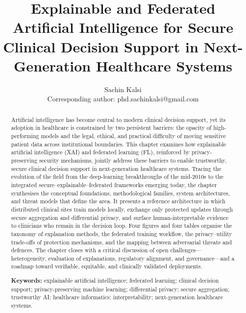 \documentclass[11pt,a4paper]{article}
\title{\textbf{Explainable and Federated Artificial Intelligence for Secure
Clinical Decision Support in Next-Generation Healthcare Systems}}
\author{Sachin Kalsi\\
\small Corresponding author: phd.sachinkalsi@gmail.com}
\date{}
\begin{document}
\maketitle

\begin{abstract}
\noindent
Artificial intelligence has become central to modern clinical decision support,
yet its adoption in healthcare is constrained by two persistent barriers: the
opacity of high-performing models and the legal, ethical, and practical
difficulty of moving sensitive patient data across institutional boundaries.
This chapter examines how explainable artificial intelligence (XAI) and
federated learning (FL), reinforced by privacy-preserving security mechanisms,
jointly address these barriers to enable trustworthy, secure clinical decision
support in next-generation healthcare systems. Tracing the evolution of the
field from the deep-learning breakthroughs of the mid-2010s to the integrated
secure--explainable--federated frameworks emerging today, the chapter
synthesises the conceptual foundations, methodological families, system
architectures, and threat models that define the area. It presents a reference
architecture in which distributed clinical sites train models locally, exchange
only protected updates through secure aggregation and differential privacy, and
surface human-interpretable evidence to clinicians who remain in the decision
loop. Four figures and four tables organise the taxonomy of explanation
methods, the federated training workflow, the privacy--utility trade-offs of
protection mechanisms, and the mapping between adversarial threats and defences.
The chapter closes with a critical discussion of open challenges---heterogeneity,
evaluation of explanations, regulatory alignment, and governance---and a roadmap
toward verifiable, equitable, and clinically validated deployments.

\vspace{0.6em}
\noindent\textbf{Keywords:} explainable artificial intelligence; federated
learning; clinical decision support; privacy-preserving machine learning;
differential privacy; secure aggregation; trustworthy AI; healthcare
informatics; interpretability; next-generation healthcare systems.
\end{abstract}

\end{document}
